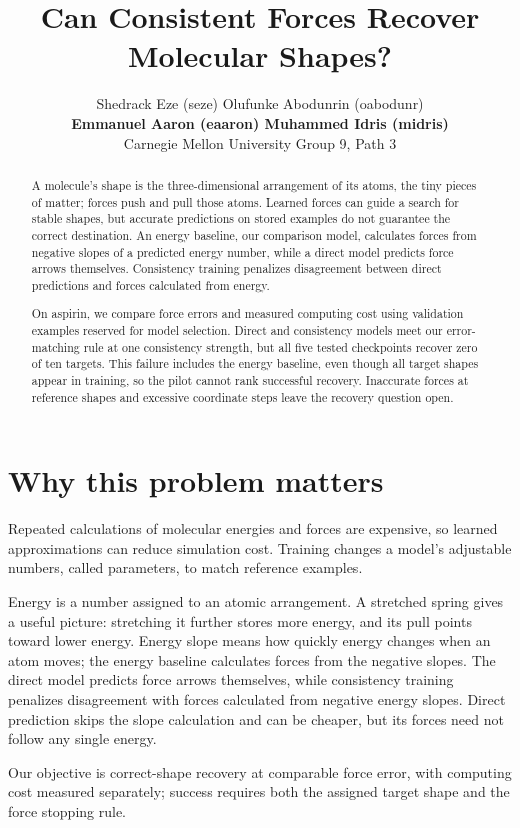 \documentclass{article}
\title{Can Consistent Forces Recover Molecular Shapes?}
\author{Shedrack Eze (seze) \quad Olufunke Abodunrin (oabodunr)\\
\textbf{Emmanuel Aaron (eaaron) \quad Muhammed Idris (midris)}\\
Carnegie Mellon University \quad Group 9, Path 3}
\begin{document}
\maketitle
\begin{abstract}
A molecule's shape is the three-dimensional arrangement of its atoms, the tiny pieces of matter; forces push and pull those atoms. Learned forces can guide a search for stable shapes, but accurate predictions on stored examples do not guarantee the correct destination. An energy baseline, our comparison model, calculates forces from negative slopes of a predicted energy number, while a direct model predicts force arrows themselves. Consistency training penalizes disagreement between direct predictions and forces calculated from energy.

On aspirin, we compare force errors and measured computing cost using validation examples reserved for model selection. Direct and consistency models meet our error-matching rule at one consistency strength, but all five tested checkpoints recover zero of ten targets. This failure includes the energy baseline, even though all target shapes appear in training, so the pilot cannot rank successful recovery. Inaccurate forces at reference shapes and excessive coordinate steps leave the recovery question open.
\end{abstract}
\section{Why this problem matters}
Repeated calculations of molecular energies and forces are expensive, so learned approximations can reduce simulation cost. Training changes a model's adjustable numbers, called parameters, to match reference examples.

Energy is a number assigned to an atomic arrangement. A stretched spring gives a useful picture: stretching it further stores more energy, and its pull points toward lower energy. Energy slope means how quickly energy changes when an atom moves; the energy baseline calculates forces from the negative slopes. The direct model predicts force arrows themselves, while consistency training penalizes disagreement with forces calculated from negative energy slopes. Direct prediction skips the slope calculation and can be cheaper, but its forces need not follow any single energy.

Our objective is correct-shape recovery at comparable force error, with computing cost measured separately; success requires both the assigned target shape and the force stopping rule.
\end{document}
